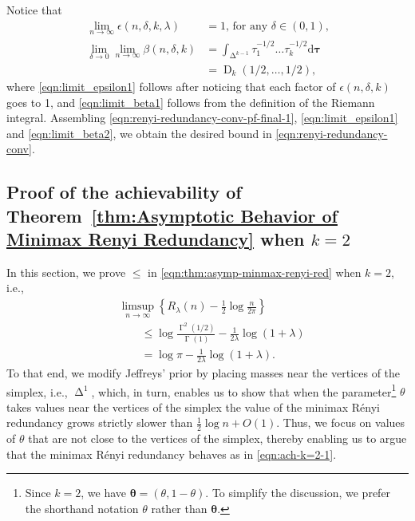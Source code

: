 \documentclass[journal, 10pt]{IEEEtran}
\newcommand{\rmd}{\mathrm{d}}
\theoremstyle{plain}
\theoremstyle{plain}
\theoremstyle{plain}
\theoremstyle{plain}
\newcommand{\boldtheta}{\mathbold{\theta}}
\newcommand{\opD}{\operatorname{D}}
\newcommand{\opGamma}{\operatorname{\Gamma}}
\newcommand{\simplex}{\operatorname{\Delta}}
\begin{document}
Notice that
\begin{align}
\lim_{n\to \infty}\epsilon(n, \delta, k, \lambda)&=1 \text{, for any }\delta\in(0,1)\text{,} \label{eqn:limit_epsilon1}\\
\lim_{\delta\to 0}\lim_{n\to \infty} \beta(n,\delta, k)&=\int_{ \simplex^{k-1}}\tau_1^{-1/2} \hdots \tau_k^{-1/2}\rmd \mathbold{\tau} \label{eqn:limit_beta1}\\
&=\opD_k(1/2, \hdots, 1/2)\text{,}
\label{eqn:limit_beta2}
\end{align}
where \eqref{eqn:limit_epsilon1} follows after noticing that each factor of $\epsilon(n,\delta, k)$ goes to 1, and \eqref{eqn:limit_beta1} follows from the definition of the Riemann integral. Assembling \eqref{eqn:renyi-redundancy-conv-pf-final-1}, \eqref{eqn:limit_epsilon1} and \eqref{eqn:limit_beta2}, we obtain the desired bound in \eqref{eqn:renyi-redundancy-conv}. \hfill \IEEEQED
\subsection{Proof of the achievability of Theorem~\ref{thm:Asymptotic Behavior of Minimax Renyi Redundancy} when $k=2$} \label{sec:subsec:ach-k=2}

In this section, we prove $\le $ in \eqref{eqn:thm:asymp-minmax-renyi-red} when $k=2$, i.e., 
\begin{align}
&\limsup_{n\to \infty} \left\{R_\lambda(n) -\frac{1}{2}\log \frac{n}{2\pi}\right\} \nonumber \\
&\qquad \le \log\frac{\opGamma^2(1/2)}{\opGamma(1)}-\frac{1}{2\lambda}\log(1+\lambda) \\ 
&\qquad =\log \pi -\frac{1}{2\lambda}\log(1+\lambda)  \text{.}
\label{eqn:ach-k=2-1}
\end{align}
To that end, we modify Jeffreys' prior by placing masses near the vertices of the simplex, i.e., $\simplex^1$, which, in turn, enables us to show that when the parameter\footnote{Since $k=2$, we have $\boldtheta=(\theta, 1-\theta)$. To simplify the discussion, we prefer the shorthand notation $\theta$ rather than $\boldtheta$.}  $\theta$  takes values near the vertices of the simplex the value of the minimax R\'enyi redundancy grows strictly slower than $\tfrac12 \log n + O(1)$. Thus, we focus on values of $\theta$ that are not close to the vertices of the simplex, thereby enabling us to argue that the minimax R\'enyi redundancy behaves as in \eqref{eqn:ach-k=2-1}.   
\end{document}
